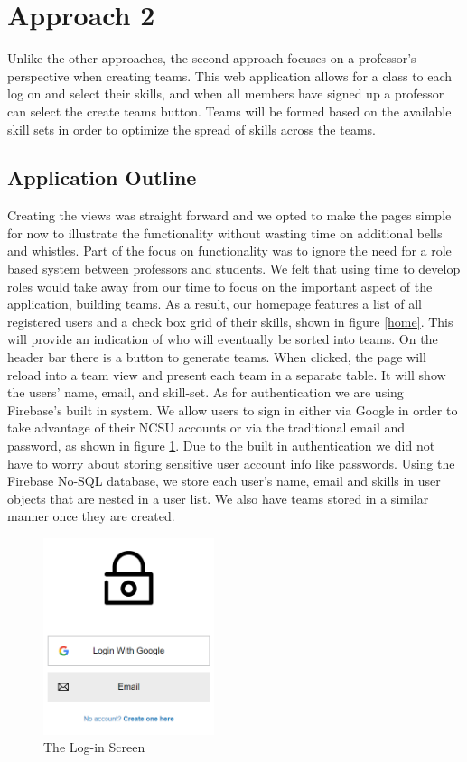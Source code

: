 \documentclass[conference]{IEEEtran}
\begin{document}
\section{Approach 2}
Unlike the other approaches, the second approach focuses on a professor's perspective when creating teams. This web application allows for a class to each log on and select their skills, and when all members have signed up a professor can select the create teams button. Teams will be formed based on the available skill sets in order to optimize the spread of skills across the teams. 

\subsection{Application Outline}
Creating the views was straight forward and we opted to make the pages simple for now to illustrate the functionality without wasting time on additional bells and whistles. Part of the focus on functionality was to ignore the need for a role based system between professors and students. We felt that using time to develop roles would take away from our time to focus on the important aspect of the application, building teams. As a result, our homepage features a list of all registered users and a check box grid of their skills, shown in figure \ref{home}. This will provide an indication of who will eventually be sorted into teams. On the header bar there is a button to generate teams. When clicked, the page will reload into a team view and present each team in a separate table. It will show the users' name, email, and skill-set. As for authentication we are using Firebase's built in system. We allow users to sign in either via Google in order to take advantage of their NCSU accounts or via the traditional email and password, as shown in figure \ref{login}. Due to the built in authentication we did not have to worry about storing sensitive user account info like passwords. Using the Firebase No-SQL database, we store each user's name, email and skills in user objects that are nested in a user list. We also have teams stored in a similar manner once they are created. 


\begin{figure}[H]
    \centering
    \includegraphics[width=5cm]{image/login.PNG}
    \caption{The Log-in Screen}
    \label{login}
\end{figure}
\end{document}
